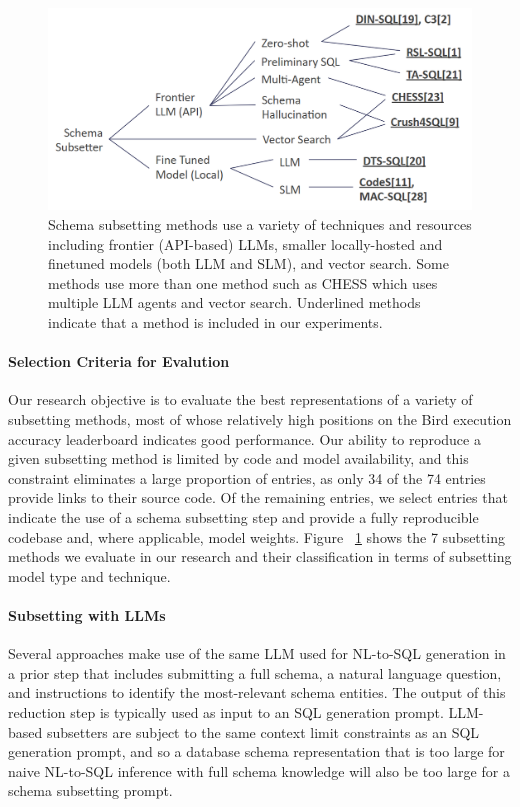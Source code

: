 \begin{figure}
  \centering
  \includegraphics[width=\linewidth]{figures/subsetter-taxonomy.png}
  \caption{Schema subsetting methods use a variety of techniques and resources including frontier (API-based) LLMs, smaller locally-hosted and finetuned models (both LLM and SLM), and vector search. Some methods use more than one method such as CHESS which uses multiple LLM agents and vector search. Underlined methods indicate that a method is included in our experiments.}
  \label{fig:subsetting-taxonomy}
\end{figure}

\paragraph{\textbf{Selection Criteria for Evalution}}

Our research objective is to evaluate the best representations of a variety of subsetting methods, most of whose relatively high positions on the Bird execution accuracy leaderboard indicates good performance.
Our ability to reproduce a given subsetting method is limited by code and model availability, and this constraint eliminates a large proportion of entries, as only 34 of the 74 entries provide links to their source code.
Of the remaining entries, we select entries that indicate the use of a schema subsetting step and provide a fully reproducible codebase and, where applicable, model weights.
Figure ~\ref{fig:subsetting-taxonomy} shows the 7 subsetting methods we evaluate in our research and their classification in terms of subsetting model type and technique.

\paragraph{\textbf{Subsetting with LLMs}} 
Several approaches make use of the same LLM used for NL-to-SQL generation in a prior step that includes submitting a full schema, a natural language question, and instructions to identify the most-relevant schema entities.
The output of this reduction step is typically used as input to an SQL generation prompt.
LLM-based subsetters are subject to the same context limit constraints as an SQL generation prompt, and so a database schema representation that is too large for naive NL-to-SQL inference with full schema knowledge will also be too large for a schema subsetting prompt.

